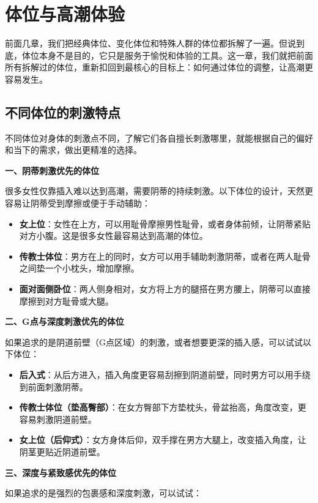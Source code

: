 \documentclass[12pt,UTF8]{ctexbook}
\begin{document}
\chapter{体位与高潮体验}

前面几章，我们把经典体位、变化体位和特殊人群的体位都拆解了一遍。但说到底，体位本身不是目的，它只是服务于愉悦和体验的工具。这一章，我们就把前面所有拆解过的体位，重新扣回到最核心的目标上：如何通过体位的调整，让高潮更容易发生。

\section{不同体位的刺激特点}

不同体位对身体的刺激点不同，了解它们各自擅长刺激哪里，就能根据自己的偏好和当下的需求，做出更精准的选择。

\textbf{一、阴蒂刺激优先的体位}

很多女性仅靠插入难以达到高潮，需要阴蒂的持续刺激。以下体位的设计，天然更容易让阴蒂受到摩擦或便于手动辅助：

\begin{itemize}
\item \textbf{女上位}：女性在上方，可以用耻骨摩擦男性耻骨，或者身体前倾，让阴蒂紧贴对方小腹。这是很多女性最容易达到高潮的体位。
\item \textbf{传教士体位}：男方在上的同时，女方可以用手辅助刺激阴蒂，或者在两人耻骨之间垫一个小枕头，增加摩擦。
\item \textbf{面对面侧卧位}：两人侧身相对，女方将上方的腿搭在男方腰上，阴蒂可以直接摩擦到对方耻骨或大腿。
\end{itemize}

\textbf{二、G点与深度刺激优先的体位}

如果追求的是阴道前壁（G点区域）的刺激，或者想要更深的插入感，可以试试以下体位：

\begin{itemize}
\item \textbf{后入式}：从后方进入，插入角度更容易刮擦到阴道前壁，同时男方可以用手绕到前面刺激阴蒂。
\item \textbf{传教士体位（垫高臀部）}：在女方臀部下方垫枕头，骨盆抬高，角度改变，更容易刺激阴道前壁。
\item \textbf{女上位（后仰式）}：女方身体后仰，双手撑在男方大腿上，改变插入角度，让阴茎更贴近阴道前壁。
\end{itemize}

\textbf{三、深度与紧致感优先的体位}

如果追求的是强烈的包裹感和深度刺激，可以试试：
\end{document}
